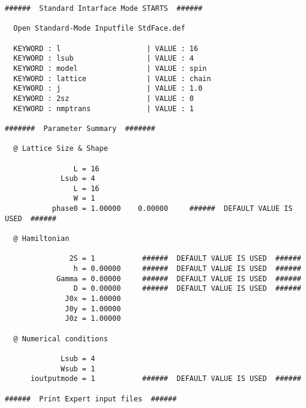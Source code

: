 \begin{verbatim} 
######  Standard Intarface Mode STARTS  ######

  Open Standard-Mode Inputfile StdFace.def 

  KEYWORD : l                    | VALUE : 16 
  KEYWORD : lsub                 | VALUE : 4 
  KEYWORD : model                | VALUE : spin 
  KEYWORD : lattice              | VALUE : chain 
  KEYWORD : j                    | VALUE : 1.0 
  KEYWORD : 2sz                  | VALUE : 0 
  KEYWORD : nmptrans             | VALUE : 1 

#######  Parameter Summary  #######

  @ Lattice Size & Shape

                L = 16 
             Lsub = 4         
                L = 16        
                W = 1         
           phase0 = 1.00000    0.00000     ######  DEFAULT VALUE IS USED  ######

  @ Hamiltonian 

               2S = 1           ######  DEFAULT VALUE IS USED  ######
                h = 0.00000     ######  DEFAULT VALUE IS USED  ######
            Gamma = 0.00000     ######  DEFAULT VALUE IS USED  ######
                D = 0.00000     ######  DEFAULT VALUE IS USED  ######
              J0x = 1.00000   
              J0y = 1.00000   
              J0z = 1.00000   

  @ Numerical conditions

             Lsub = 4         
             Wsub = 1         
      ioutputmode = 1           ######  DEFAULT VALUE IS USED  ######

######  Print Expert input files  ######


\end{verbatim}
